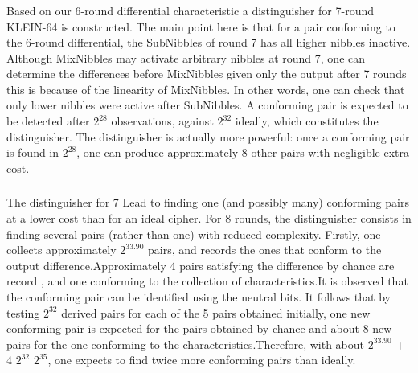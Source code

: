 \documentclass[preprint]{transcrypto}
\begin{document}
\subsubsection{}
Based on our 6-round differential characteristic a distinguisher for 7-round KLEIN-64 is constructed. The main point here is that for a pair conforming to the 6-round differential, the SubNibbles of round 7 has all higher nibbles inactive. Although MixNibbles may activate arbitrary nibbles at round 7, one can determine the differences before MixNibbles given only the output after 7 rounds this is because of the linearity of MixNibbles. In other words, one can check that only lower nibbles were active after SubNibbles. A conforming pair is expected to be detected after $2^{28}$ observations, against $2^{32}$ ideally, which constitutes the distinguisher. The distinguisher is actually more powerful: once a conforming pair is found in $2^{28}$, one can produce approximately 8 other pairs with negligible extra cost.\\


\subsubsection{}
The distinguisher for 7 Lead to finding one (and possibly many) conforming pairs at a lower cost than for an ideal cipher. For 8 rounds, the distinguisher consists in finding several pairs (rather than one) with reduced complexity. Firstly, one collects approximately $2^{33.90}$ pairs, and records the ones that conform to the output difference.Approximately 4 pairs satisfying the difference by chance are record , and one conforming to the collection of characteristics.It is observed that the conforming pair can be identified using the neutral bits. It follows that by testing $2^{32}$ derived pairs for each of the 5 pairs obtained initially, one new conforming pair is expected for the pairs obtained by chance and about 8 new pairs for the one conforming to the characteristics.Therefore, with about $2^{33.90}$ + 4  $2^{32}$ \approx $2^{35}$, one expects to find twice more conforming pairs than ideally.\\
\end{document}
